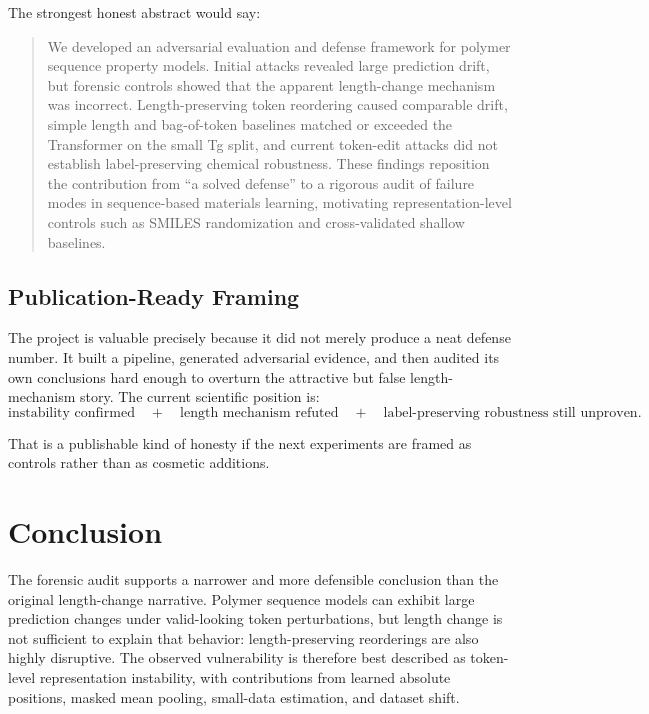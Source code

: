 \documentclass[11pt]{article}
\begin{document}
The strongest honest abstract would say:

\begin{quote}
We developed an adversarial evaluation and defense framework for polymer
sequence property models. Initial attacks revealed large prediction drift, but
forensic controls showed that the apparent length-change mechanism was
incorrect. Length-preserving token reordering caused comparable drift, simple
length and bag-of-token baselines matched or exceeded the Transformer on the
small Tg split, and current token-edit attacks did not establish
label-preserving chemical robustness. These findings reposition the contribution
from ``a solved defense'' to a rigorous audit of failure modes in sequence-based
materials learning, motivating representation-level controls such as SMILES
randomization and cross-validated shallow baselines.
\end{quote}

\subsection{Publication-Ready Framing}

The project is valuable precisely because it did not merely produce a neat
defense number. It built a pipeline, generated adversarial evidence, and then
audited its own conclusions hard enough to overturn the attractive but false
length-mechanism story. The current scientific position is:
\[
\text{instability confirmed} \quad + \quad
\text{length mechanism refuted} \quad + \quad
\text{label-preserving robustness still unproven}.
\]

That is a publishable kind of honesty if the next experiments are framed as
controls rather than as cosmetic additions.

\section{Conclusion}

The forensic audit supports a narrower and more defensible conclusion than the
original length-change narrative. Polymer sequence models can exhibit large
prediction changes under valid-looking token perturbations, but length change
is not sufficient to explain that behavior: length-preserving reorderings are
also highly disruptive. The observed vulnerability is therefore best described
as token-level representation instability, with contributions from learned
absolute positions, masked mean pooling, small-data estimation, and dataset
shift.
\end{document}
